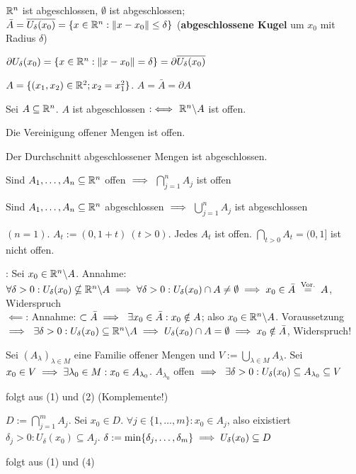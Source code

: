 \documentclass[a4paper,twoside,DIV15,BCOR12mm,chapterprefix=true,headings=twolinechapter]{scrbook}
\begin{document}
\begin{beispiele}
\item $\mathbb{R}^n$ ist abgeschlossen, $\emptyset$ ist abgeschlossen; \\ 
  $\bar{A}=\overline{U_\delta(x_0)} = \{x\in\mathbb{R}^n: \|x-x_0\| \le \delta\}$ (\textbf{abgeschlossene Kugel} um $x_0$ mit Radius $\delta$)
\item $\partial U_\delta(x_0) = \{x\in\mathbb{R}^n: \|x-x_0\|=\delta\} = \partial \overline{U_\delta(x_0)}$
\item $A = \{(x_1,x_2)\in\mathbb{R}^2; x_2 = x_1^2\}$. $A=\bar{A}=\partial A$
\end{beispiele}

\begin{satz}
 \begin{liste}
 \item Sei $A\subseteq\mathbb{R}^n$. $A$ ist abgeschlossen $:\iff$  $\mathbb{R}^n\backslash A$ ist offen.
 \item Die Vereinigung offener Mengen ist offen.
 \item Der Durchschnitt abgeschlossener Mengen ist abgeschlossen.
 \item Sind $A_1,\ldots,A_n\subseteq\mathbb{R}^n$ offen $\implies$ $\bigcap_{j=1}^nA_j$ ist offen
 \item Sind $A_1,\ldots,A_n\subseteq\mathbb{R}^n$ abgeschlossen $\implies$ $\bigcup_{j=1}^nA_j$ ist abgeschlossen
 \end{liste}
\end{satz}

\begin{beispiel}
  $(n=1)$. $A_t := (0,1+t)\ (t>0)$. Jedes $A_t$ ist offen. $\bigcap_{t>0}A_t = (0,1]$ ist nicht offen.
\end{beispiel}

\begin{beweise}
 \item \glqq\folgt\grqq: Sei $x_0\in\mathbb{R}^n\backslash A$. Annahme: $\forall \delta>0: U_\delta(x_0) \nsubseteq \MdR^n\backslash A\folgt\forall\delta>0: U_\delta(x_0)\cap A\ne\emptyset \folgt x_0\in\bar{A} \gleichnach{Vor.} A$, Widerspruch \\
 \glqq$\impliedby$\grqq: Annahme: $\subset\bar{A} \implies \ \exists x_0\in\bar{A}: x_0\notin A$; also $x_0\in\mathbb{R}^n\backslash A$. Voraussetzung $\implies \ \exists \delta > 0: U_\delta(x_0) \subseteq \mathbb{R}^n\backslash A \implies U_\delta(x_0) \cap A = \emptyset \implies x_0 \notin \bar{A}$, Widerspruch!
 \item Sei $(A_\lambda)_{\lambda\in M}$ eine Familie offener Mengen und $V := \bigcup_{\lambda\in M} A_\lambda$. Sei $x_0\in V \implies \exists\lambda_0\in M: x_0 \in A_{\lambda_0}$. $A_{\lambda_0}$ offen $\implies \ \exists \delta > 0: U_\delta(x_0) \subseteq A_{\lambda_0} \subseteq V$
 \item folgt aus (1) und (2) (Komplemente!)
 \item $D:=\bigcap_{j=1}^mA_j$. Sei $x_0\in D$. $\forall j\in\{1,\ldots,m\}: x_0\in A_j$, also eixistiert $\delta_j>0: U_\delta(x_0)\subseteq A_j$. $\delta := \min\{\delta_j,\ldots,\delta_m\} \implies U_\delta(x_0) \subseteq D$
 \item folgt aus (1) und (4)
\end{beweise}
\end{document}
